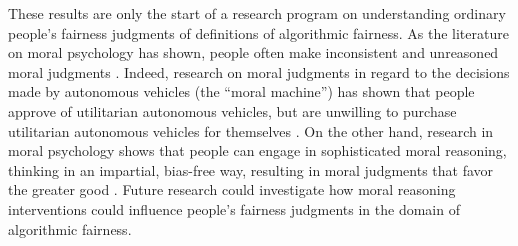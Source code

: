\documentclass[letterpaper]{article} %
\begin{document}
These  results are only the start of a research program on understanding ordinary people's fairness judgments of definitions of algorithmic fairness. As the literature on moral psychology has shown, people often make inconsistent and unreasoned moral judgments \cite{greene2014moral}. Indeed,  research on moral judgments in regard to the decisions made by autonomous vehicles (the ``moral machine'') has shown that people approve of utilitarian autonomous vehicles, but are unwilling to purchase utilitarian autonomous vehicles for themselves \cite{bonnefon2016social}. On the other hand,  research in moral psychology shows that people can engage in sophisticated moral reasoning, thinking in an impartial, bias-free way, resulting in moral judgments that favor the greater good \cite{huang2019veil}. Future research could investigate how moral reasoning interventions could influence people's fairness judgments in the domain of algorithmic fairness.



 

\end{document}
